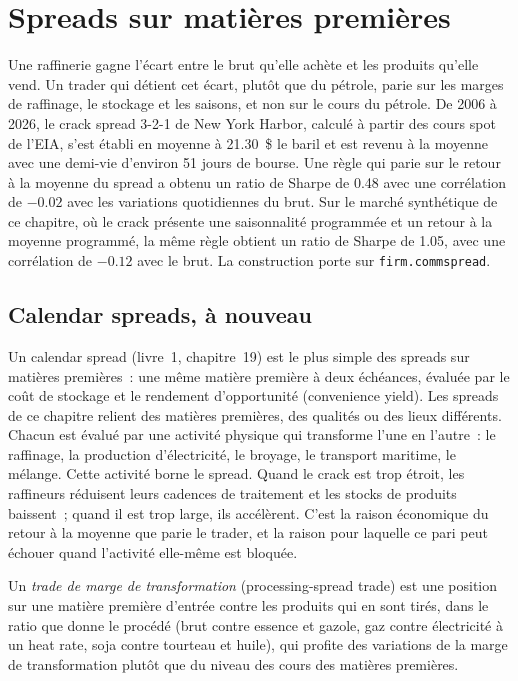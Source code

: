 \chapter{Spreads sur matières premières}\label{ch:s2:commodity-spreads}

Une raffinerie gagne l'écart entre le brut qu'elle achète et les produits qu'elle vend. Un trader qui détient cet écart, plutôt que du pétrole, parie sur
les marges de raffinage, le stockage et les saisons, et non sur le cours du pétrole. De 2006 à 2026, le crack spread 3-2-1 de New York Harbor, calculé à partir des cours spot
de l'EIA, s'est établi en moyenne à 21.30~\$ le baril et est revenu à la moyenne avec une demi-vie d'environ 51 jours de bourse. Une règle qui parie sur le retour à la moyenne du spread a obtenu un ratio de Sharpe de 0.48
avec une corrélation de $-0.02$ avec les variations quotidiennes du brut. Sur le marché synthétique de ce chapitre, où le crack présente une saisonnalité programmée et un retour
à la moyenne programmé, la même règle obtient un ratio de Sharpe de 1.05, avec une corrélation de $-0.12$ avec le brut. La construction porte sur \texttt{firm.commspread}.

\section{Calendar spreads, à nouveau}

Un calendar spread (livre~1, chapitre~19) est le plus simple des spreads sur matières premières~: une même matière première à deux échéances, évaluée par le coût de stockage et le rendement d'opportunité (convenience yield). Les
spreads de ce chapitre relient des matières premières, des qualités ou des lieux différents. Chacun est évalué par une activité physique qui transforme l'une en l'autre~: le raffinage,
la production d'électricité, le broyage, le transport maritime, le mélange. Cette activité borne le spread. Quand le crack est trop étroit, les raffineurs réduisent leurs cadences de traitement et les stocks de produits
baissent~; quand il est trop large, ils accélèrent. C'est la raison économique du retour à la moyenne que parie le trader, et la raison pour laquelle ce pari peut échouer quand
l'activité elle-même est bloquée.

\begin{definition}\label{def:s2:commodity-spreads:processing}
Un \emph{trade de marge de transformation} (processing-spread trade) est une position sur une matière première d'entrée contre les produits qui en sont tirés, dans le ratio que donne le
procédé (brut contre essence et gazole, gaz contre électricité à un heat rate, soja contre tourteau et huile), qui profite des variations de la
marge de transformation plutôt que du niveau des cours des matières premières.
\end{definition}

